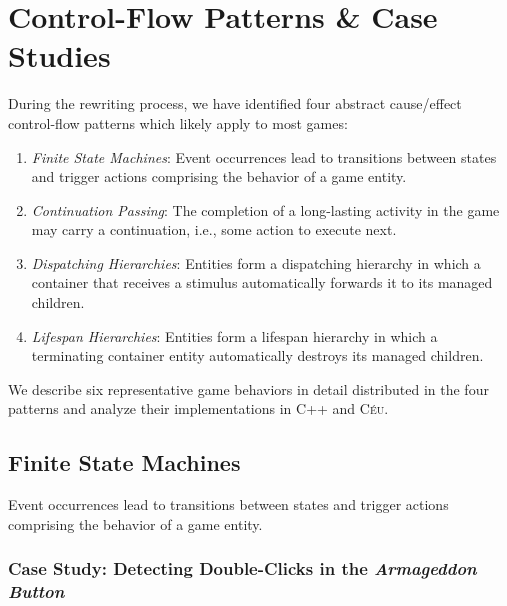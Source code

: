 \documentclass[times,twocolumn,final]{elsarticle}
\newcommand{\CEU}{\textsc{C\'{e}u}\xspace}
\begin{document}
\section{Control-Flow Patterns \& Case Studies}
\label{sec.pats}

During the rewriting process, we have identified four abstract cause/effect
control-flow patterns which likely apply to most games:

\begin{enumerate}
\item \emph{Finite State Machines}:
    Event occurrences lead to transitions between states and trigger actions
    comprising the behavior of a game entity.
\item \emph{Continuation Passing}:
    The completion of a long-lasting activity in the game may carry a
    continuation, i.e., some action to execute next.
\item \emph{Dispatching Hierarchies}:
    Entities form a dispatching hierarchy in which a container that receives a
    stimulus automatically forwards it to its managed children.
\item \emph{Lifespan Hierarchies}:
    Entities form a lifespan hierarchy in which a terminating container entity
    automatically destroys its managed children.
\end{enumerate}

We describe six representative game behaviors in detail distributed in the four
patterns and analyze their implementations in C++ and \CEU.%

\subsection{Finite State Machines}
\label{sec.pats.fsms}

    Event occurrences lead to transitions between states and trigger actions
    comprising the behavior of a game entity.

\subsubsection{Case Study: Detecting Double-Clicks in the \emph{Armageddon Button}}
\end{document}
